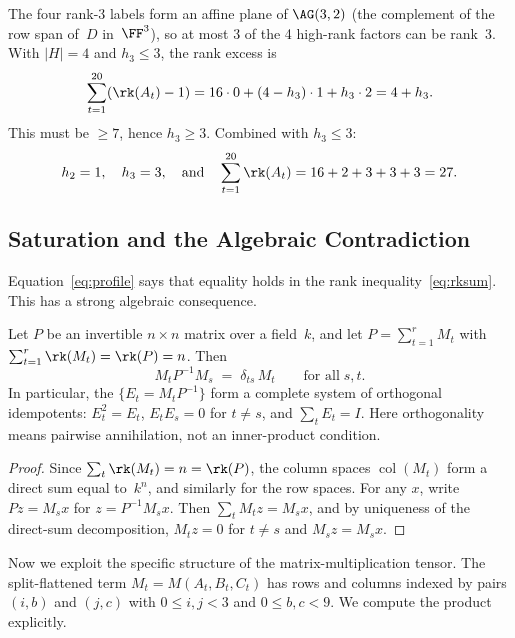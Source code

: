 \documentclass[11pt,a4paper]{article}
\begin{document}
The four rank-3 labels form an affine plane of $\AG(3,2)$ (the complement of the row span of~$D$ in~$\FF^3$), so at most 3 of the 4 high-rank factors can be rank~3.  With $|H|=4$ and $h_3\le 3$, the rank excess is
\[
  \sum_{t=1}^{20}(\rk(A_t)-1) = 16\cdot 0 + (4-h_3)\cdot 1 + h_3\cdot 2 = 4+h_3.
\]
This must be $\ge 7$, hence $h_3\ge 3$.  Combined with $h_3\le 3$:
\begin{equation}\label{eq:profile}
  h_2=1,\quad h_3=3,\quad\text{and}\quad \sum_{t=1}^{20}\rk(A_t) = 16+2+3+3+3 = 27.
\end{equation}

\subsection{Saturation and the Algebraic Contradiction}\label{sec:saturation}

Equation~\eqref{eq:profile} says that equality holds in the rank inequality~\eqref{eq:rksum}.  This has a strong algebraic consequence.

\begin{lemma}\label{lem:saturation}
  Let $P$ be an invertible $n\times n$ matrix over a field~$k$, and let $P=\sum_{t=1}^r M_t$ with $\sum_{t=1}^r\rk(M_t)=\rk(P)=n$.  Then
  \begin{equation}\label{eq:idempotent}
    M_t P^{-1} M_s \;=\; \delta_{ts}\,M_t \qquad\text{for all}\;s,t.
  \end{equation}
  In particular, the $\{E_t=M_tP^{-1}\}$ form a complete system of orthogonal idempotents: $E_t^2=E_t$, $E_tE_s=0$ for $t\ne s$, and $\sum_tE_t=I$. Here orthogonality means pairwise annihilation, not an inner-product condition.
\end{lemma}

\begin{proof}
  Since $\sum_t\rk(M_t)=n=\rk(P)$, the column spaces $\operatorname{col}(M_t)$ form a direct sum equal to~$k^n$, and similarly for the row spaces.  For any $x$, write $Pz=M_sx$ for $z=P^{-1}M_sx$.  Then $\sum_t M_tz=M_sx$, and by uniqueness of the direct-sum decomposition, $M_tz=0$ for $t\ne s$ and $M_sz=M_sx$.
\end{proof}

Now we exploit the specific structure of the matrix-multiplication tensor.  The split-flattened term $M_t=M(A_t,B_t,C_t)$ has rows and columns indexed by pairs $(i,b)$ and $(j,c)$ with $0\le i,j<3$ and $0\le b,c<9$.  We compute the product explicitly.
\end{document}
